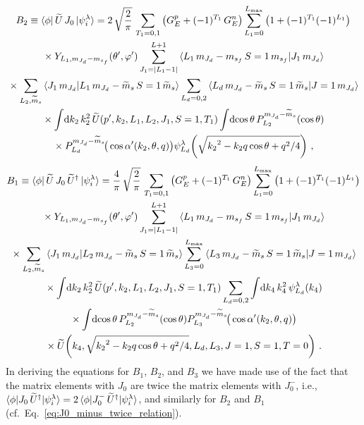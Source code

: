   \begin{multline}
   B_2 \equiv \la \phi | \,\widetilde{U}\, J_0 \, | \psi_i^\lambda \ra
   = 2 \, \sqrt{\frac{2}{\pi}} \,
   \sum_{T_1 = 0,1} \big(G_E ^p + (-1)^{T_1} \, G_E^n\big)
   \sum_{L_1 = 0}^{L_{\rm max}} \big(1 + (-1)^{T_1} (-1)^{L_1}\big) \\
   \null \times Y_{L_1 , \mJd - \msf} (\thetacm, \phicm)
   \sum_{J_1 = |L_1 - 1|}^{L+1}
   \CG{L_1}{\mJd - \msf}{S=1}{\msf}{J_1}{\mJd} \\
   \null \times
   \sum_{L_2, \widetilde{m}_s}
   \braket{J_1 \, \mJd}{L_1 \, \mJd - \wt{m}_s \, S= 1 \, \wt{m}_s}
   \sum_{L_d = 0, 2}
   \CG{L_d}{\mJd - \widetilde{m}_s}{S=1}{\widetilde{m}_s}{J = 1}{\mJd} \\
   \null \times
   \int \! \dd k_2 \, k_2^2 \, \widetilde{U}(\pp, k_2, L_1, L_2, J_1, S=1,T_1)
   \int \! \dcostheta \,
   P_{L_2}^{\mJd-\widetilde{m}_s}(\cos\theta) \\
   \null \times
   P_{L_d}^{\mJd-\widetilde{m}_s}\!\big(\cos\thetacprime(k_2, \theta, q)\big)
   \psi_{L_d}^\lambda\!\left(\sqrt{{k_2}^2 - k_2 q \cos\theta + q^2/4}\right)
   \,,
  \end{multline}
  \begin{multline}
   B_1 \equiv \la \phi | \,\widetilde{U}\, J_0 \,\widetilde{U}^\dag \, |
   \psi_i^\lambda \ra = \frac{4}{\pi} \, \sqrt{\frac{2}{\pi}} \,
   \sum_{T_1 = 0,1} \big(G_E ^p + (-1)^{T_1} \, G_E^n\big)
   \sum_{L_1 = 0}^{L_{\rm max}} \big(1 + (-1)^{T_1} (-1)^{L_1}\big) \\
   \null \times
   Y_{L_1 , \mJd - \msf} (\thetacm, \phicm)
   \sum_{J_1 = |L_1 - 1|}^{L+1}
   \CG{L_1}{\mJd-\msf}{S=1}{\msf}{J_1}{\mJd} \\
   \null \times
   \sum_{L_2, \widetilde{m}_s}
   \braket{J_1 \, \mJd}{L_2 \, \mJd - \wt{m}_s \, S=1 \, \wt{m}_s}
   \sum_{L_3 = 0}^{L_{\rm max}}
   \CG{L_3}{\mJd-\widetilde{m}_s}{S=1}{\widetilde{m}_s}{J=1}{\mJd} \\
   \null \times
   \int \! \dd k_2 \, k_2^2 \, \widetilde{U} (\pp, k_2, L_1, L_2, J_1, S = 1,T_1)
   \sum_{L_d = 0, 2} \int \! \dd k_4 \, k_4^2 \, \psi_{L_d}^\lambda (k_4) \\
   \null \times
   \int \! \dcostheta \, P_{L_2}^{\mJd - \widetilde{m}_s}(\cos\theta)
   P_{L_3}^{\mJd - \widetilde{m}_s}\!\big(\cos \thetacprime(k_2, \theta, q)\big)
   \\ \null \times
   \widetilde{U}\!\left(
     k_4, \sqrt{{k_2}^2 - k_2 q \cos\theta + q^2/4}, L_d, L_3, J=1, S=1, T=0
   \right) \,.
  \end{multline}
  In deriving the equations for $B_1$, $B_2$, and $B_3$ we have made use of
  the fact that the matrix elements with $J_0$ are twice the matrix elements
  with $J_0^-$, i.e., $\langle \phi|J_0 \, \widetilde{U}^\dag|\psi_i^\lambda\rangle
  = 2 \,\langle \phi|J_0^- \, \widetilde{U}^\dag|\psi_i^\lambda\rangle$, and
  similarly for $B_2$ and $B_1$ (cf.~Eq.~\ref{eq:J0_minus_twice_relation}).

